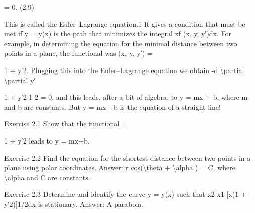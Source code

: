 \begin{example}
= 0.
(2.9)

This is called the Euler--Lagrange equation.1 It gives a condition that must be
met if y = y(x) is the path that minimizes the integral
xf
(x, y, y′)dx.
For example, in determining the equation for the minimal distance between
two points in a plane, the functional was
(x, y, y′) =

1 + y′2.
Plugging this into the Euler--Lagrange equation we obtain
-d
\textbackslash{}partial
\textbackslash{}partial y′

1 + y′2 1
2 = 0,
and this leads, after a bit of algebra, to
y = mx + b,
where m and b are constants. But y = mx +b is the equation of a straight line!
\end{example}

\begin{exercise}
Exercise 2.1 Show that the functional  =

1 + y′2 leads to y = mx+b.
\end{exercise}

\begin{exercise}
Exercise 2.2 Find the equation for the shortest distance between two
points in a plane using polar coordinates. Answer: r cos(\textbackslash{}theta  + \textbackslash{}alpha ) = C,
where \textbackslash{}alpha  and C are constants.
\end{exercise}

\begin{exercise}
Exercise 2.3 Determine and identify the curve y
= y(x) such that
x2
x1 [x(1 + y′2)]1/2dx is stationary. Answer: A parabola.
\end{exercise}

